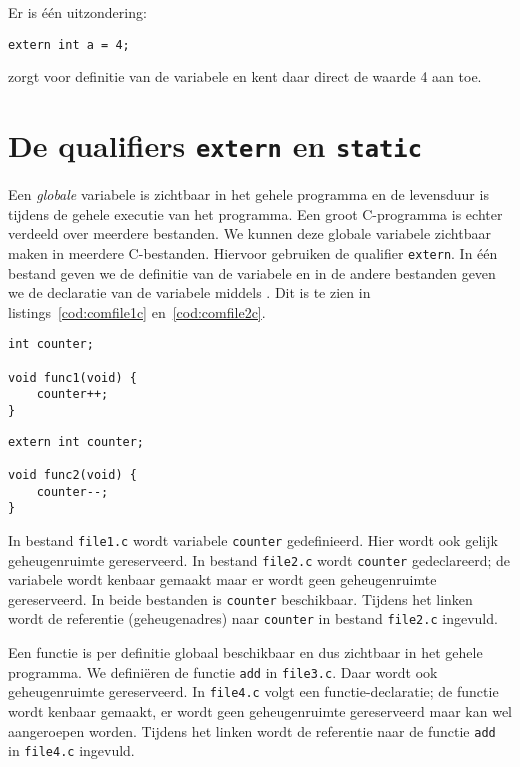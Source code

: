 Er is één uitzondering:

\begin{lstlisting}[style=lstoneline]
extern int a = 4;
\end{lstlisting}

zorgt voor definitie van de variabele  en kent daar direct de waarde 4 aan toe.


\section{De qualifiers \texttt{extern} en \texttt{static}}
Een \textsl{globale} variabele is zichtbaar in het gehele programma en de levensduur is tijdens de gehele executie van het programma. Een groot C-programma is echter verdeeld over meerdere bestanden. We kunnen deze globale variabele zichtbaar maken in meerdere C-bestanden. Hiervoor gebruiken de qualifier \texttt{extern}. In één bestand geven we de definitie van de variabele en in de andere bestanden geven we de declaratie van de variabele middels . Dit is te zien in listings~\ref{cod:comfile1c} en~\ref{cod:comfile2c}.

\begin{minipage}[c]{0.45\textwidth}
\begin{lstlisting}[caption=\texttt{file1.c},label=cod:comfile1c]
int counter;

void func1(void) {
    counter++;
}
\end{lstlisting}
\end{minipage}\hfill%
\begin{minipage}[c]{0.45\textwidth}
\begin{lstlisting}[caption=\texttt{file2.c},label=cod:comfile2c]
extern int counter;

void func2(void) {
    counter--;
}
\end{lstlisting}
\end{minipage}

In bestand \texttt{file1.c} wordt variabele \texttt{counter} gedefinieerd. Hier wordt ook gelijk geheugenruimte gereserveerd. In bestand \texttt{file2.c} wordt \texttt{counter} gedeclareerd; de variabele wordt kenbaar gemaakt maar er wordt geen geheugenruimte gereserveerd. In beide bestanden is \texttt{counter} beschikbaar. Tijdens het linken wordt de referentie (geheugenadres) naar \texttt{counter} in bestand \texttt{file2.c} ingevuld.

Een functie is per definitie globaal beschikbaar en dus zichtbaar in het gehele programma. We definiëren de functie \texttt{add} in \texttt{file3.c}. Daar wordt ook geheugenruimte gereserveerd. In \texttt{file4.c} volgt een functie-declaratie; de functie wordt kenbaar gemaakt, er wordt geen geheugenruimte gereserveerd maar kan wel aangeroepen worden. Tijdens het linken wordt de referentie naar de functie \texttt{add} in \texttt{file4.c} ingevuld.

